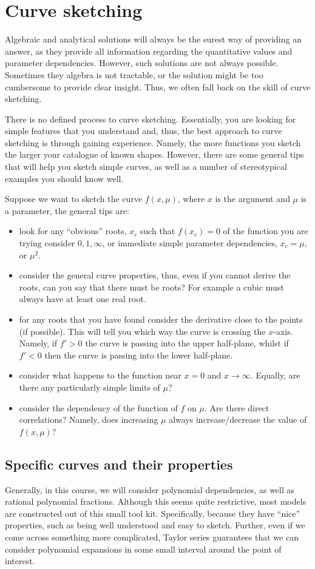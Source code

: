 \section{Curve sketching}
Algebraic and analytical solutions will always be the surest way of providing an answer, as they provide all information regarding the quantitative values and parameter dependencies. However, such solutions are not always possible. Sometimes they algebra is not tractable, or the solution might be too cumbersome to provide clear insight. Thus, we often fall back on the skill of curve sketching.

There is no defined process to curve sketching. Essentially, you are looking for simple features that you understand and, thus, the best approach to curve sketching is through gaining experience. Namely, the more functions you sketch the larger your catalogue of known shapes. However, there are some general tips that will help you sketch simple curves, as well as a number of stereotypical examples you should know well.

Suppose we want to sketch the curve $f(x,\mu)$, where $x$ is the argument and $\mu$ is a parameter, the general tips are:
\begin{itemize}
\item look for any ``obvious'' roots, $x_c$ such that $f(x_c)=0$ of the function you are trying \ie  consider $0,1,\infty$, or immediate simple parameter dependencies, \eg $x_c=\mu$, or $\mu^2$.
\item consider the general curve properties, thus, even if you cannot derive the roots, can you say that there must be roots? For example a cubic must always have at least one real root.
\item for any roots that you have found consider the derivative close to the points (if possible). This will tell you which way the curve is crossing the $x$-axis. Namely, if $f'>0$ the curve is passing into the upper half-plane, whilst if $f'<0$ then the curve is passing into the lower half-plane. 
\item consider what happens to the function near $x=0$ and $x\rightarrow \infty$. Equally, are there any particularly simple limits of $\mu$?
\item consider the dependency of the function of $f$ on $\mu$. Are there direct correlations? Namely, does increasing $\mu$ always increase/decrease the value of $f(x,\mu)$?
\end{itemize}

\subsection{Specific curves and their properties}
Generally, in this course, we will consider polynomial dependencies, as well as rational polynomial fractions. Although this seems quite restrictive, most models are constructed out of this small tool kit. Specifically, because they have ``nice'' properties, such as being well understood and easy to sketch. Further, even if we come across something more complicated, Taylor series guarantees that we can consider polynomial expansions in some small interval around the point of interest.

